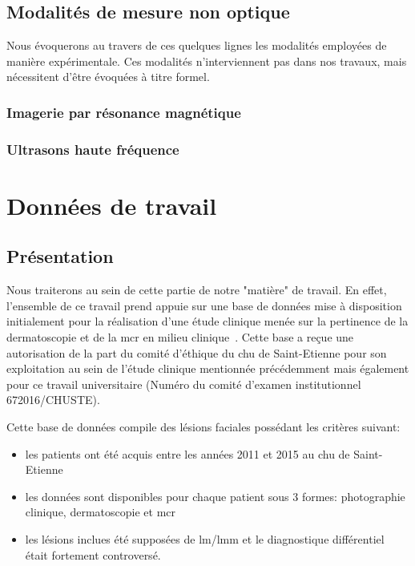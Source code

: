 \subsection{Modalités de mesure non optique}
Nous évoquerons au travers de ces quelques lignes les modalités employées de manière expérimentale. Ces modalités n’interviennent pas dans nos travaux, mais nécessitent d’être évoquées à titre formel.

\subsubsection{Imagerie par résonance magnétique}
\subsubsection{Ultrasons haute fréquence}

\clearpage
\section{Données de travail}
\subsection{Présentation}
Nous traiterons au sein de cette partie de notre "matière" de travail. En effet, l'ensemble de ce travail prend appuie sur une base de données mise à disposition initialement pour la réalisation d'une étude clinique menée sur la pertinence de la dermatoscopie et de la \gls{mcr} en milieu clinique~\cite{Cinotti2018}. Cette base a reçue une autorisation de la part du comité d'éthique du \gls{chu} de Saint-Etienne pour son exploitation au sein de l'étude clinique mentionnée précédemment mais également pour ce travail universitaire (Numéro du comité d'examen institutionnel 672016/CHUSTE).\par 
Cette base de données compile des lésions faciales possédant les critères suivant:
\begin{itemize}
\item les patients ont été acquis entre les années 2011 et 2015 au \gls{chu} de Saint-Etienne
\item les données sont disponibles pour chaque patient sous 3 formes: photographie clinique, dermatoscopie et \gls{mcr}
\item les lésions inclues été supposées de \gls{lm}/\gls{lmm} et le diagnostique différentiel était fortement controversé.
\end{itemize}\par

